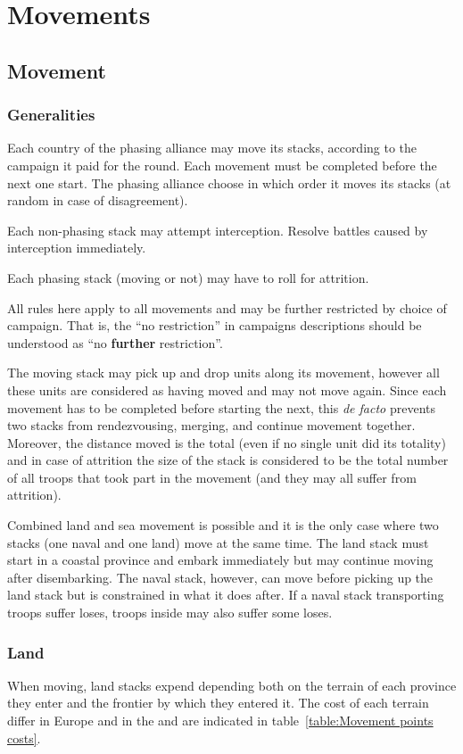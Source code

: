 \section{Movements}
\subsection{Movement}
\subsubsection{Generalities}
Each country of the phasing alliance may move its stacks, according to the
campaign it paid for the round. Each movement must be completed before the
next one start. The phasing alliance choose in which order it moves its stacks
(at random in case of disagreement).

Each non-phasing stack may attempt interception. Resolve battles caused by
interception immediately.

Each phasing stack (moving or not) may have to roll for attrition.

All rules here apply to all movements and may be further restricted by choice
of campaign. That is, the ``no restriction'' in campaigns descriptions should
be understood as ``no \textbf{further} restriction''.

The moving stack may pick up and drop units along its movement, however all
these units are considered as having moved and may not move again. Since each
movement has to be completed before starting the next, this \emph{de facto}
prevents two stacks from rendezvousing, merging, and continue movement
together. Moreover, the distance moved is the total (even if no single unit
did its totality) and in case of attrition the size of the stack is considered
to be the total number of all troops that took part in the movement (and they
may all suffer from attrition).

Combined land and sea movement is possible and it is the only case where two
stacks (one naval and one land) move at the same time. The land stack must
start in a coastal province and embark immediately but may continue moving
after disembarking. The naval stack, however, can move before picking up the
land stack but is constrained in what it does after. If a naval stack
transporting troops suffer loses, troops inside may also suffer some loses.

\subsubsection{Land}
When moving, land stacks expend \MP depending both on the terrain of each
province they enter and the frontier by which they entered it. The cost of
each terrain differ in Europe and in the \ROTW and are indicated in
table~\ref{table:Movement points costs}.

